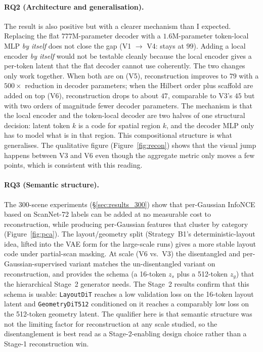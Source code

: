 \paragraph{RQ2 (Architecture and generalisation).} The result is also positive but with a clearer mechanism than I expected. Replacing the flat $777$M-parameter decoder with a $1.6$M-parameter token-local MLP \emph{by itself} does not close the gap (V1 $\to$ V4: stays at $99$). Adding a local encoder \emph{by itself} would not be testable cleanly because the local encoder gives a per-token latent that the flat decoder cannot use coherently. The two changes only work together. When both are on (V5), reconstruction improves to $79$ with a $500\times$ reduction in decoder parameters; when the Hilbert order plus scaffold are added on top (V6), reconstruction drops to about $47$, comparable to V3's $45$ but with two orders of magnitude fewer decoder parameters. The mechanism is that the local encoder and the token-local decoder are two halves of one structural decision: latent token $k$ is a code for spatial region $k$, and the decoder MLP only has to model what is in that region. This compositional structure is what generalises. The qualitative figure (Figure~\ref{fig:recon}) shows that the visual jump happens between V3 and V6 even though the aggregate metric only moves a few points, which is consistent with this reading.

\paragraph{RQ3 (Semantic structure).} The 300-scene experiments (\S\ref{sec:results_300}) show that per-Gaussian InfoNCE based on ScanNet-72 labels can be added at no measurable cost to reconstruction, while producing per-Gaussian features that cluster by category (Figure~\ref{fig:pca}). The layout/geometry split (Strategy~B1's deterministic-layout idea, lifted into the VAE form for the large-scale runs) gives a more stable layout code under partial-scan masking. At scale (V6 vs.\ V3) the disentangled and per-Gaussian-supervised variant matches the un-disentangled variant on reconstruction, and provides the schema (a 16-token $z_s$ plus a 512-token $z_g$) that the hierarchical Stage~2 generator needs. The Stage~2 results confirm that this schema is usable: \texttt{LayoutDiT} reaches a low validation loss on the 16-token layout latent and \texttt{GeometryDiT512} conditioned on it reaches a comparably low loss on the 512-token geometry latent. The qualifier here is that semantic structure was not the limiting factor for reconstruction at any scale studied, so the disentanglement is best read as a Stage-2-enabling design choice rather than a Stage-1 reconstruction win.

